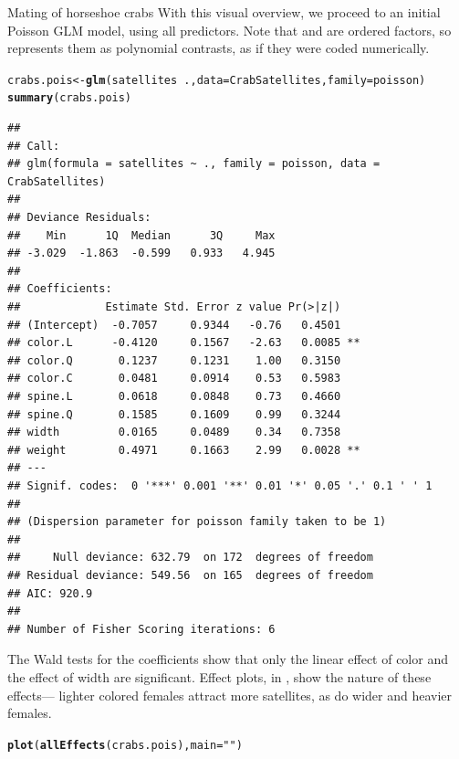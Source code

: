 \documentclass[11pt]{book}\usepackage[]{graphicx}\usepackage[]{color}
\makeatletter
\newcommand{\hlstr}[1]{\textcolor[rgb]{0.192,0.494,0.8}{#1}}%
\newcommand{\hlopt}[1]{\textcolor[rgb]{0,0,0}{#1}}%
\newcommand{\hlstd}[1]{\textcolor[rgb]{0.345,0.345,0.345}{#1}}%
\newcommand{\hlkwb}[1]{\textcolor[rgb]{0.69,0.353,0.396}{#1}}%
\newcommand{\hlkwc}[1]{\textcolor[rgb]{0.333,0.667,0.333}{#1}}%
\newcommand{\hlkwd}[1]{\textcolor[rgb]{0.737,0.353,0.396}{\textbf{#1}}}%
\newenvironment{kframe}{%
 \def\at@end@of@kframe{}%
 \ifinner\ifhmode%
  \def\at@end@of@kframe{\end{minipage}}%
  \begin{minipage}{\columnwidth}%
 \fi\fi%
 \def\FrameCommand##1{\hskip\@totalleftmargin \hskip-\fboxsep
 \colorbox{shadecolor}{##1}\hskip-\fboxsep
     \hskip-\linewidth \hskip-\@totalleftmargin \hskip\columnwidth}%
 \MakeFramed {\advance\hsize-\width
   \@totalleftmargin\z@ \linewidth\hsize
   \@setminipage}}%
 {\par\unskip\endMakeFramed%
 \at@end@of@kframe}
\newenvironment{knitrout}{}{} %
\renewenvironment{knitrout}{\small\renewcommand{\baselinestretch}{.85}}{} %
\makeatother
\begin{document}
\begin{Example}[crabs1]{Mating of horseshoe crabs}
With this visual overview, we proceed to an initial Poisson GLM model, using all predictors.
Note that  and  are ordered factors, so  represents them
as polynomial contrasts, as if they were coded numerically.
\begin{knitrout}
\color{fgcolor}\begin{kframe}
\begin{alltt}
\hlstd{crabs.pois} \hlkwb{<-} \hlkwd{glm}\hlstd{(satellites} \hlopt{~} \hlstd{.,} \hlkwc{data}\hlstd{=CrabSatellites,} \hlkwc{family}\hlstd{=poisson)}
\hlkwd{summary}\hlstd{(crabs.pois)}
\end{alltt}
\begin{verbatim}
## 
## Call:
## glm(formula = satellites ~ ., family = poisson, data = CrabSatellites)
## 
## Deviance Residuals: 
##    Min      1Q  Median      3Q     Max  
## -3.029  -1.863  -0.599   0.933   4.945  
## 
## Coefficients:
##             Estimate Std. Error z value Pr(>|z|)   
## (Intercept)  -0.7057     0.9344   -0.76   0.4501   
## color.L      -0.4120     0.1567   -2.63   0.0085 **
## color.Q       0.1237     0.1231    1.00   0.3150   
## color.C       0.0481     0.0914    0.53   0.5983   
## spine.L       0.0618     0.0848    0.73   0.4660   
## spine.Q       0.1585     0.1609    0.99   0.3244   
## width         0.0165     0.0489    0.34   0.7358   
## weight        0.4971     0.1663    2.99   0.0028 **
## ---
## Signif. codes:  0 '***' 0.001 '**' 0.01 '*' 0.05 '.' 0.1 ' ' 1
## 
## (Dispersion parameter for poisson family taken to be 1)
## 
##     Null deviance: 632.79  on 172  degrees of freedom
## Residual deviance: 549.56  on 165  degrees of freedom
## AIC: 920.9
## 
## Number of Fisher Scoring iterations: 6
\end{verbatim}
\end{kframe}
\end{knitrout}
The Wald tests for the coefficients show that only the linear effect of color and the effect
of width are significant.
Effect plots, in , show the nature of these
effects--- lighter colored females attract more satellites, as do wider and heavier females.

\begin{knitrout}
\color{fgcolor}\begin{kframe}
\begin{alltt}
\hlkwd{plot}\hlstd{(}\hlkwd{allEffects}\hlstd{(crabs.pois),} \hlkwc{main}\hlstd{=}\hlstr{""}\hlstd{)}
\end{alltt}
\end{kframe}\begin{figure}[!htbp]


\end{figure}
\end{knitrout}
\end{Example}
\end{document}
